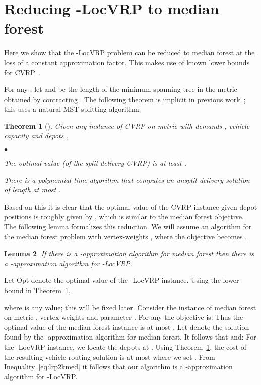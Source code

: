 \documentclass[11pt,twoside,a4paper]{article}
\newtheorem{theorem}{Theorem}
\newtheorem{lemma}[theorem]{Lemma}
\newenvironment{proof}{

\noindent{\bf Proof:}} {\hfill


}
\newcommand{\initOneLiners}{\setlength{\itemsep}{0pt}
    \setlength{\parsep }{0pt}
    \setlength{\topsep }{0pt}
}
\newenvironment{OneLiners}[1][\ensuremath{\bullet}]
    {\begin{list}
        {#1}
        {\initOneLiners}}
    {\end{list}}
\def\lrp{-LocVRP\xspace}
\def\opt{{\sf Opt}\xspace}
\def\kmf{ median forest\xspace}
\begin{document}
\section{Reducing \lrp to  median forest} \label{sec:redn}
\def\flow{{\sf Flow}}
\def\tree{{\sf Tree}}
\def\med{{\sf Med}}

Here we show that the \lrp problem can be reduced to  median forest at the loss of a constant approximation factor.
This makes use of known lower bounds for CVRP~\cite{HK85,LS90,HKM10}.

For any , let  and  be the
length of the minimum spanning tree in the metric obtained by contracting . The following theorem is implicit in
previous work~\cite{HK85,LS90,HKM10}; this uses a natural MST splitting algorithm.
\begin{theorem}[\cite{HKM10}] \label{th:cvrp}
Given any instance of CVRP on metric  with demands , vehicle capacity  and depots ,
\begin{OneLiners}
 \item The optimal value (of the split-delivery CVRP) is at least .
 \item There is a polynomial time algorithm that computes an unsplit-delivery solution of length at most .
\end{OneLiners}
\end{theorem}


Based on this it is clear that the optimal value of the CVRP instance given depot positions  is roughly given by
, which is similar to the \kmf objective. The following lemma formalizes this reduction. We will
assume an algorithm for the  median forest problem with vertex-weights , where the objective becomes
.


\begin{lemma}\label{lem:lrp2kmed}
If there is a -approximation algorithm for  median forest then there is a -approximation algorithm
for \lrp.
\end{lemma}
\begin{proof} Let \opt denote the optimal value of the \lrp instance. Using the lower bound in Theorem~\ref{th:cvrp},

where  is any value; this will be fixed later. Consider the instance of  median forest on metric
, vertex weights  and parameter . For any
 the objective is:
 Thus the optimal value of
the \kmf instance is at most . Let  denote the solution found by the
-approximation algorithm for \kmf. It follows that  and:
 For the \lrp
instance, we locate the depots at . Using Theorem~\ref{th:cvrp}, the cost of the resulting vehicle routing
solution is at most  where we set . From Inequality~\eqref{eq:lrp2kmed} it follows
that our algorithm is a -approximation algorithm for \lrp.
\end{proof}
\end{document}

